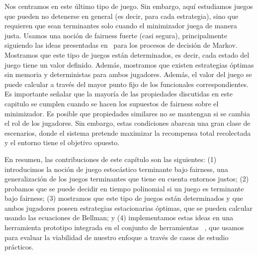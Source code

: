 	    Nos centramos en este último tipo de juego. Sin embargo, aquí estudiamos juegos que pueden no detenerse en general (es decir, para cada estrategia), sino que requieren que sean terminantes solo cuando el minimizador juega de manera justa.
        Usamos una noción de fairness fuerte (casi segura), principalmente siguiendo las ideas presentadas en~\cite{DBLP:journals/dc/BaierK98} para los procesos de decisión de Markov. Mostramos que este tipo de juegos están determinados, es decir, cada estado del juego tiene un valor definido. Además, mostramos que existen estrategias óptimas sin memoria y deterministas para ambos jugadores. Además, el valor del juego se puede calcular a través del mayor punto fijo de los funcionales correspondientes.
Es importante señalar que la mayoría de las propiedades discutidas en este capitulo se cumplen cuando se hacen los supuestos de fairness sobre el minimizador. Es posible que propiedades similares no se mantengan si se cambia el rol de los jugadores.
Sin embargo, estas condiciones abarcan una gran clase de escenarios, donde el sistema pretende maximizar la recompensa total recolectada y el entorno tiene el objetivo opuesto.

En resumen, las contribuciones de este capítulo son las siguientes: (1) introducimos la noción de juego estocástico terminante bajo fairness, una generalización de los juegos terminantes que tiene en cuenta entornos justos; (2) probamos que se puede decidir en tiempo polinomial si un juego es terminante bajo fairness; (3) mostramos que este tipo de juegos están determinados y que ambos jugadores poseen estrategias estacionarias óptimas, que se pueden calcular usando las ecuaciones de Bellman; y (4) implementamos estas ideas en una herramienta prototipo integrada en el conjunto de herramientas {\PrismGames}~\cite{DBLP:conf/cav/KwiatkowskaN0S20}, que usamos para evaluar la viabilidad de nuestro enfoque a través de casos de estudio prácticos.




